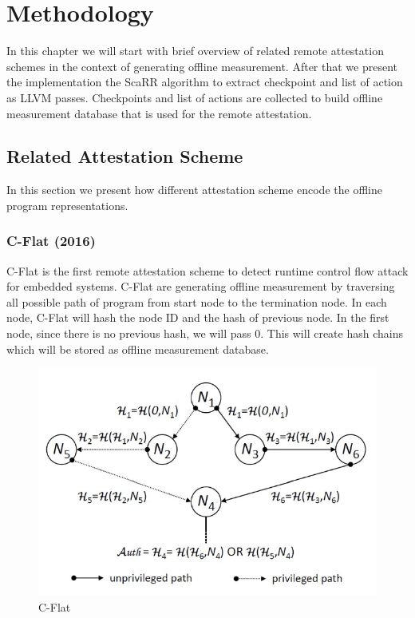 
\chapter{Methodology} %

\label{Chapter4} %

In this chapter we will start with brief overview of related remote attestation schemes in the context of generating offline measurement. After that we present the implementation the ScaRR algorithm to extract checkpoint and list of action as LLVM passes. Checkpoints and list of actions are collected to build offline measurement database that is used for the remote attestation.

\section{Related Attestation Scheme}


In this section we present how different attestation scheme encode the offline program representations.

\subsection{C-Flat (2016)}

C-Flat \cite{aberaCFLATControlFlowAttestation2016} is the first remote attestation scheme to detect runtime control flow attack for embedded systems. C-Flat are generating offline measurement by traversing all possible path of program from start node to the termination node. In each node, C-Flat will hash the node ID and the hash of previous node. In the first node, since there is no previous hash, we will pass 0. This will create hash chains which will be stored as offline measurement database.

\begin{figure}[htbp]
\centerline{\includegraphics[scale=.5]{Figures/cflat.png}}
\caption{C-Flat}
\label{fig:4-1}
\end{figure}

